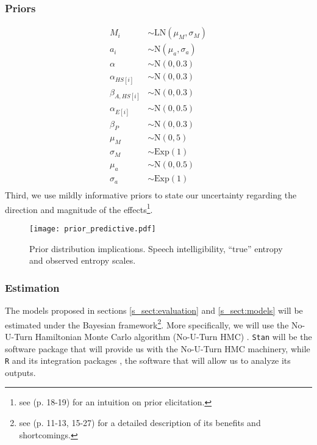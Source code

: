 \subsubsection{Priors}
%
\begin{align}
	M_{i} & \sim \text{LN}( \mu_{M}, \sigma_{M}) \\
	a_{i} & \sim \text{N}(\mu_{a}, \sigma_{a}) \\
	\alpha & \sim \text{N}(0, 0.3) \\
	\alpha_{HS[i]} & \sim \text{N}(0, 0.3) \\
	\beta_{A, HS[i]} & \sim \text{N}(0 , 0.3) \\
	\alpha_{E[i]} & \sim \text{N}(0, 0.5) \\
	\beta_{P} & \sim \text{N}(0, 0.3) \\
	\mu_{M} & \sim \text{N}(0, 5) \\
	\sigma_{M} & \sim \text{Exp}(1) \\
	\mu_{a} & \sim \text{N}(0, 0.5) \\
	\sigma_{a} & \sim \text{Exp}(1)\\
\end{align}
Third, we use mildly informative priors to state our uncertainty regarding the direction and magnitude of the effects\footnote{see \citet{Rivera_2021} (p. 18-19) for an intuition on prior elicitation.}. 
\begin{figure}
	\centering
	\texttt{[image: prior\_predictive.pdf]}
	\caption[Prior distribution implications]{Prior distribution implications. Speech intelligibility, ``true'' entropy and observed entropy scales.}
	\label{fig:priors}
\end{figure}
%
%
\subsubsection{Estimation}
The models proposed in sections \ref{s_sect:evaluation} and \ref{s_sect:models} will be estimated under the Bayesian framework\footnote{see \citet{Rivera_2021} (p. 11-13, 15-27) for a detailed description of its benefits and shortcomings.}. More specifically, we will use the No-U-Turn Hamiltonian Monte Carlo algorithm (No-U-Turn HMC) \citep{Betancourt_et_al_2013, Duane_et_al_1987, Hoffman_et_al_2014, Neal_2012}. \texttt{Stan} \citep{Stan_2020} will be the software package that will provide us with the No-U-Turn HMC machinery, while \texttt{R} \citep{R_2015} and its integration packages \citep{RStan_2020}, the software that will allow us to analyze its outputs.
%
%
